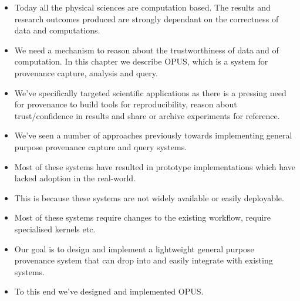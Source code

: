 \documentclass[withindex,glossary]{cam-thesis}
\begin{document}
\begin{itemize}
\item Today all the physical sciences are computation based. The results and research outcomes produced are strongly dependant on the correctness of data and computations. 
\item We need a mechanism to reason about the trustworthiness of data and of computation. In this chapter we describe OPUS, which is a system for provenance capture, analysis and query.
\item We've specifically targeted scientific applications as there is a pressing need for provenance to build tools for reproducibility, reason about trust/confidence in results
and share or archive experiments for reference.
\item We've seen a number of approaches previously towards implementing general purpose provenance capture and query systems.
\item Most of these systems have resulted in prototype implementations which have lacked adoption in the real-world.
\item This is because these systems are not widely available or easily deployable.
\item Most of these systems require changes to the existing workflow, require specialised kernels etc.
\item Our goal is to design and implement a lightweight general purpose provenance system that can drop into and easily integrate with existing systems.
\item To this end we've designed and implemented OPUS.
\end{itemize}
\end{document}
